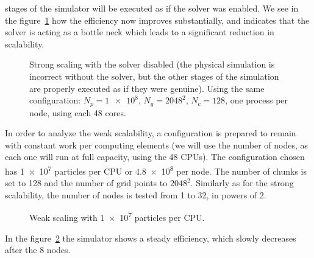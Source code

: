 stages of the simulator will be executed as if the solver was enabled. We see in 
the figure~\ref{fig:strong-scaling-without-solver} how the efficiency now 
improves substantially, and indicates that the solver is acting as a bottle neck 
which leads to a significant reduction in scalability.
%
\begin{figure}[ht]%
\centering
{}
	\caption{Strong scaling with the solver disabled (the physical simulation is 
	incorrect without the solver, but the other stages of the simulation are 
	properly executed as if they were genuine).  Using the same configuration: 
	$N_p = \num{1e8}$, $N_g = 2048^2$,
	$N_c = 128$, one process per node, using each 48 cores.}
	\label{fig:strong-scaling-without-solver}
\end{figure}%
%

In order to analyze the weak scalability, a configuration is prepared to remain 
with constant work per computing elements (we will use the number of nodes, as 
each one will run at full capacity, using the 48 CPUs). The configuration chosen 
has \num{1e7} particles per CPU or \num{4.8e8} per node. The number of chunks is 
set to 128 and the number of grid points to $2048^2$. Similarly as for the 
strong scalability, the number of nodes is tested from 1 to 32, in powers of 2.
%
\begin{figure}%
\centering
{}
\caption{Weak scaling with \num{1e7} particles per CPU.}
\label{fig:weak-scaling}
\end{figure}%
%
In the figure~\ref{fig:weak-scaling} the simulator shows a steady efficiency, 
which slowly decreases after the 8 nodes.

